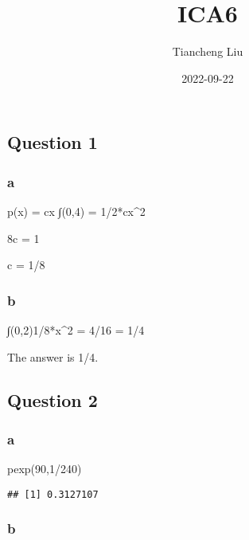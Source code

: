\documentclass[
]{article}
\title{ICA6}
\author{Tiancheng Liu}
\date{2022-09-22}
\newenvironment{Shaded}{\begin{snugshade}}{\end{snugshade}}
\newcommand{\DecValTok}[1]{\textcolor[rgb]{0.00,0.00,0.81}{#1}}
\newcommand{\FunctionTok}[1]{\textcolor[rgb]{0.00,0.00,0.00}{#1}}
\newcommand{\NormalTok}[1]{#1}
\newcommand{\SpecialCharTok}[1]{\textcolor[rgb]{0.00,0.00,0.00}{#1}}
\begin{document}
\maketitle

\hypertarget{question-1}{%
\subsection{Question 1}\label{question-1}}

\hypertarget{a}{%
\subsubsection{a}\label{a}}

p(x) = cx ∫(0,4) = 1/2*cx\^{}2

8c = 1

c = 1/8

\hypertarget{b}{%
\subsubsection{b}\label{b}}

∫(0,2)1/8*x\^{}2 = 4/16 = 1/4

The answer is 1/4.

\hypertarget{question-2}{%
\subsection{Question 2}\label{question-2}}

\hypertarget{a-1}{%
\subsubsection{a}\label{a-1}}

\begin{Shaded}
\begin{Highlighting}[]
\FunctionTok{pexp}\NormalTok{(}\DecValTok{90}\NormalTok{,}\DecValTok{1}\SpecialCharTok{/}\DecValTok{240}\NormalTok{)}
\end{Highlighting}
\end{Shaded}

\begin{verbatim}
## [1] 0.3127107
\end{verbatim}

\hypertarget{b-1}{%
\subsubsection{b}\label{b-1}}
\end{document}

